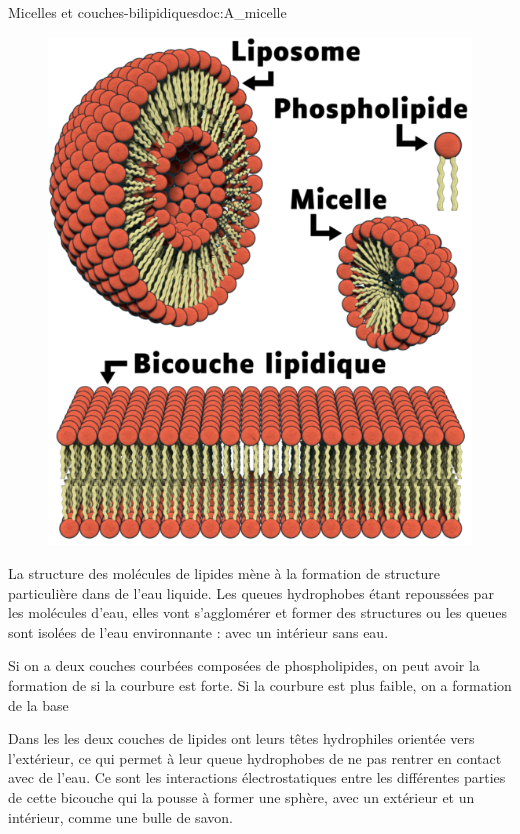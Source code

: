 \pasCorrection{\newpage \vspace*{-18pt}}
\begin{doc}{Micelles et couches-bilipidiques}{doc:A_micelle}
  \begin{figure}
    \centering
    \vspace*{-30pt}
    \includegraphics[width=0.95\linewidth]{images/proteines/liposome_micelle_bicouche}
  \end{figure}

  La structure des molécules de lipides mène à la formation de structure particulière dans de l'eau liquide.
  Les queues hydrophobes étant repoussées par les molécules d'eau, elles vont s'agglomérer et former des structures ou les queues sont isolées de l'eau environnante :  avec un intérieur sans eau.
  \smallskip

  Si on a deux couches courbées composées de phospholipides,  on peut avoir la formation de  si la courbure est forte. Si la courbure est plus faible, on a formation de la base 
  \smallskip
  
  Dans les  les deux couches de lipides ont leurs têtes hydrophiles orientée vers l'extérieur, ce qui permet à leur queue hydrophobes de ne pas rentrer en contact avec de l'eau. 
  Ce sont les interactions électrostatiques entre les différentes parties de cette bicouche qui la pousse à former une sphère, avec un extérieur et un intérieur, comme une bulle de savon.
\end{doc}

